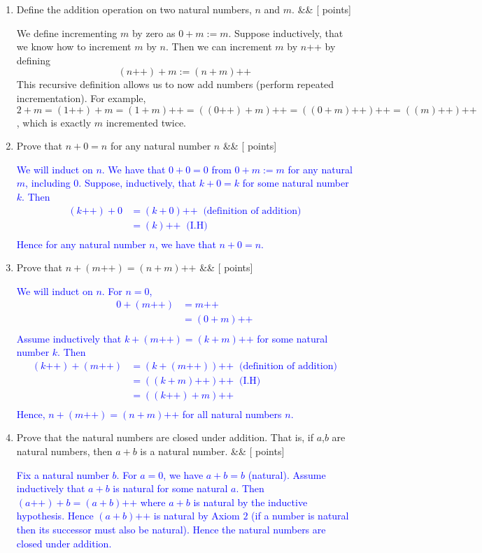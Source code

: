 \documentclass[12pt]{article}
\newcommand{\points}[1]{\hfill {[#1 points]}}
\newcommand{\problem}[2][]{%
  \item {#2}%
  \ifx&#1&%
  \else%
    \points{#1}%
  \fi
  \par\vspace{0.5em}
}
\begin{document}
\begin{enumerate}[leftmargin=*, label=\textbf{\arabic*.}]

    \problem{Define the addition operation on two natural numbers, $n$ and $m$.}
	We define incrementing $m$ by zero as $0 + m := m$. Suppose inductively, that we know how to increment $m$ by $n$. Then we can increment $m$ by $n$++ by defining $$(n\text{++}) + m := (n + m)\text{++}$$ This recursive definition allows us to now add numbers (perform repeated incrementation). For example, $2+m = (1\text{++})+m = (1+m)\text{++} = ((0\text{++})+m)\text{++} = ((0+m)\text{++})\text{++} = ((m)\text{++})\text{++}$, which is exactly $m$ incremented twice.
	
    \problem{Prove that $n+0 = n$ for any natural number $n$}
        	\textcolor{blue}{ We will induct on $n$. We have that $0+0 = 0$ from $0 + m := m$ for any natural $m$, including $0$. Suppose, inductively, that $k+0=k$ for some natural number $k$. Then 
	\begin{align*}
	(k\text{++}) + 0 &= (k+0)\text{++} \;\; \text{(definition of addition)} \\
	&= (k)\text{++} \;\; \text{(I.H)} \\
	\end{align*}
	Hence for any natural number $n$, we have that $n+0 = n$.
}

    \problem{Prove that $n + (m\text{++}) = (n + m)\text{++}$}
        	\textcolor{blue}{We will induct on $n$. For $n = 0$,
	\begin{align*}
	0 + (m\text{++}) &= m\text{++} \\
	&= (0 + m)\text{++} \\
	\end{align*}
	Assume inductively that $k + (m\text{++}) = (k + m)\text{++}$ for some natural number $k$. Then
	\begin{align*}
	(k\text{++}) + (m\text{++}) &= (k + (m\text{++}))\text{++}  \;\; \text{(definition of addition)}\\
	&= ((k+m)\text{++})\text{++} \;\; \text{(I.H)} \\
	&= ((k\text{++}) + m)\text{++} \\
	\end{align*}
	Hence, $n + (m\text{++}) = (n + m)\text{++}$ for all natural numbers $n$.}
	
	
	 \problem{Prove that the natural numbers are closed under addition. That is, if $a$,$b$ are natural numbers, then $a+b$ is a natural number.}
    	\textcolor{blue}{Fix a natural number $b$. For $a = 0$, we have $a + b = b$ (natural). Assume inductively that $a+b$ is natural for some natural $a$. Then $(a\text{++}) + b = (a+b)\text{++}$ where $a+b$ is natural by the inductive hypothesis. Hence $(a+b)\text{++}$ is natural by Axiom $2$ (if a number is natural then its successor must also be natural). Hence the natural numbers are closed under addition.}
	

\end{enumerate}
\end{document}
